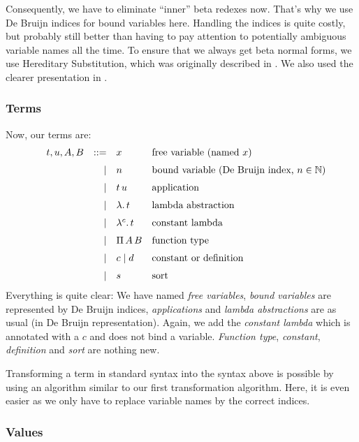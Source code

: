 \documentclass[12pt, a4paper, titlepage]{article}
\newcommand{\sspace}{\,}
\newcommand{\la}{\lambda}
\newcommand{\LaH}[1]{\la . \sspace #1}
\newcommand{\KH}[1]{\la^c . \sspace #1}
\newcommand{\ApH}[2]{#1 \sspace #2}
\newcommand{\PiH}[2]{\Pi \sspace #1 \sspace #2}
\begin{document}
Consequently, we have to eliminate ``inner'' beta redexes now. That's why we use De Bruijn indices for bound variables here. Handling the indices is quite costly, but probably still better than having to pay attention to potentially ambiguous variable names all the time. To ensure that we always get beta normal forms, we use Hereditary Substitution, which was originally described in \cite{watkins}. We also used the clearer presentation in \cite{abel}.

\subsubsection{Terms} 

Now, our terms are:
\[
\begin{array}{llrll} 
       & t,u,A,B & ::= & x & \mbox{free variable (named $x$)} \\
\noalign{\medskip}
			                   && \mid & n & \mbox{bound variable (De Bruijn index, $n \in \mathbb{N}$)} \\
\noalign{\medskip}
			                   && \mid & \ApH t u & \mbox{application} \\
\noalign{\medskip}
			                   && \mid & \LaH t & \mbox{lambda abstraction} \\
\noalign{\medskip}
			                   && \mid & \KH t & \mbox{constant lambda} \\
\noalign{\medskip}
			                   && \mid & \PiH A B  & \mbox{function type} \\
\noalign{\medskip}
			                   && \mid & c \mid d  & \mbox{constant or definition} \\
\noalign{\medskip}
			                   && \mid & s  & \mbox{sort} 
\end{array}
\]
Everything is quite clear: We have named \emph{free variables}, \emph{bound variables} are represented by De Bruijn indices, \emph{applications} and \emph{lambda abstractions} are as usual (in De Bruijn representation). Again, we add the \emph{constant lambda} which is annotated with a $c$ and does not bind a variable. \emph{Function type}, \emph{constant}, \emph{definition} and \emph{sort} are nothing new.

Transforming a term in standard syntax into the syntax above is possible by using an algorithm similar to our first transformation algorithm. Here, it is even easier as we only have to replace variable names by the correct indices.

\subsubsection{Values}
\end{document}
